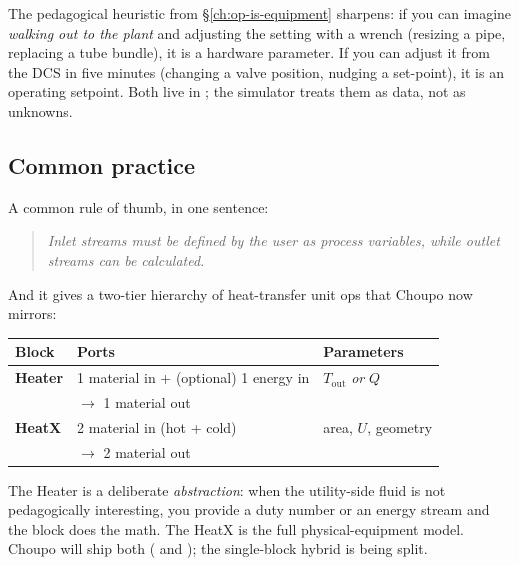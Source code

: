 \documentclass[11pt,a4paper]{article}
\begin{document}
\begin{intuition}
The pedagogical heuristic from \S\ref{ch:op-is-equipment}
sharpens: if you can imagine \emph{walking out to the plant} and
adjusting the setting with a wrench (resizing a pipe, replacing
a tube bundle), it is a hardware parameter.  If you can adjust
it from the DCS in five minutes (changing a valve position,
nudging a set-point), it is an operating setpoint.  Both live in
; the simulator treats them as data, not as
unknowns.
\end{intuition}

\subsection{Common practice}

A common rule of thumb, in one sentence:

\begin{quotation}\small\textit{
Inlet streams must be defined by the user as process variables,
while outlet streams can be calculated.
}\end{quotation}

\noindent And it gives a two-tier hierarchy of heat-transfer unit ops
that Choupo now mirrors:

\begin{center}\small
\begin{tabular}{@{}lll@{}}
\toprule
Block             & Ports                                    & Parameters \\
\midrule
\textbf{Heater}   & 1 material in + (optional) 1 energy in   & $T_{\!\text{out}}$ \emph{or} $Q$ \\
                  & $\to$ 1 material out                     & \\
\textbf{HeatX}    & 2 material in (hot + cold)               & area, $U$, geometry \\
                  & $\to$ 2 material out                     & \\
\bottomrule
\end{tabular}
\end{center}

\noindent The Heater is a deliberate \emph{abstraction}: when the
utility-side fluid is not pedagogically interesting, you provide a
duty number or an energy stream and the block does the math.  The
HeatX is the full physical-equipment model.  Choupo will
ship both ( and ); the single-block hybrid is being split.
\end{document}
